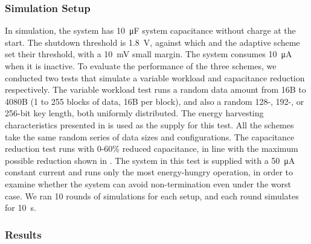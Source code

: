
\subsubsection{Simulation Setup}

In simulation, the system has \SI{10}{\micro\farad} system capacitance without charge at the start. 
The shutdown threshold is \SI{1.8}{\volt}, against which \debs{} and the adaptive scheme set their threshold, with a \SI{10}{\milli\volt} small margin. 
The system consumes \SI{10}{\micro\ampere} when it is inactive.
To evaluate the performance of the three schemes, we conducted two tests that simulate a variable workload and capacitance reduction respectively.  
The variable workload test runs a random data amount from 16B to 4080B (1 to 255 blocks of data, 16B per block), and also a random 128-, 192-, or 256-bit key length, both uniformly distributed. 
The energy harvesting characteristics presented in  is used as the supply for this test. 
All the schemes take the same random series of data sizes and configurations.
The capacitance reduction test runs with 0-60\% reduced capacitance, in line with the maximum possible reduction shown in .
The system in this test is supplied with a \SI{50}{\micro\ampere} constant current and runs only the most energy-hungry operation, in order to examine whether the system can avoid non-termination even under the worst case.  
We ran 10 rounds of simulations for each setup, and each round simulates for \SI{10}{\second}. 

\subsubsection{Results}

% 
% 

%


